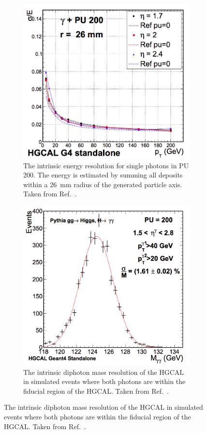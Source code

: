 \begin{figure}[h!]
  \centering
  \begin{subfigure}{0.45\textwidth}
    \includegraphics[width=\textwidth]{Figures/HGCAL/SinglePhotonReso.png}
    \caption{The intrinsic energy resolution for single photons in PU 200. 
    The energy is estimated by summing all deposits within a \SI{26}{mm} radius of the generated particle axis. Taken from Ref.~\cite{HGCAL}.}
    \label{fig:hgcal_PhotonReso}
  \end{subfigure}
  \begin{subfigure}{0.46\textwidth}
    \includegraphics[width=\textwidth]{Figures/HGCAL/HggReso.png}
    \caption{The intrinsic diphoton mass resolution of the HGCAL in simulated \Hgg events where both photons are within the fiducial region of the HGCAL. Taken from Ref.~\cite{HGCAL}.}
    \label{fig:hgcal_DiphotonReso}
  \end{subfigure}
\end{figure}

